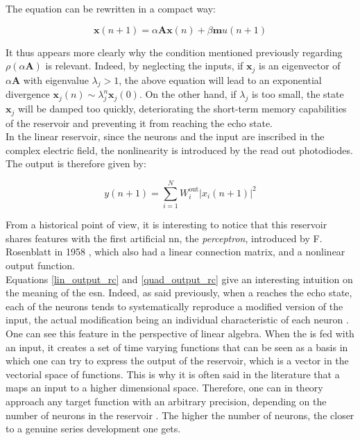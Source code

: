 The equation can be rewritten in a compact way:

\begin{equation}
	\mathbf{x}(n+1) = \alpha \mathbf{A} \mathbf{x}(n) + \beta \mathbf{m} u(n+1)
	\label{rc_lin_dynamics}
\end{equation}

It thus appears more clearly why the condition mentioned previously regarding $\rho \left( \alpha \mathbf{A} \right)$ is relevant. Indeed, by neglecting the inputs, if $\mathbf{x}_j$ is an eigenvector of $\alpha \mathbf{A}$ with eigenvalue $\lambda_j>1$, the above equation will lead to an exponential divergence $\mathbf{x}_j(n) \sim \lambda_j^n \mathbf{x}_j(0)$. On the other hand, if $\lambda_j$ is too small, the state $\mathbf{x}_j$ will be damped too quickly, deteriorating the short-term memory capabilities of the reservoir and preventing it from reaching the echo state. \\

In the linear reservoir, since the neurons and the input are inscribed in the complex electric field, the nonlinearity is introduced by the read out photodiodes. The output is therefore given by:

\begin{equation}
	y(n+1) = \sum_{i=1}^{N} W^{\text{out}}_i |x_i (n+1)|^2
	\label{quad_output_rc}
\end{equation}

From a historical point of view, it is interesting to notice that this reservoir shares features with the first artificial \gls{nn}, the \emph{perceptron}, introduced by F. Rosenblatt in 1958 \cite{Rosenblatt58theperceptron}, which also had a linear connection matrix, and a nonlinear output function.\\

 Equations \eqref{lin_output_rc} and \eqref{quad_output_rc} give an interesting intuition on the meaning of the \gls{esn}. Indeed, as said previously, when a \rc reaches the echo state, each of the neurons tends to systematically reproduce a modified version of the input, the actual modification being an individual characteristic of each neuron \cite{Jaeger2004}. One can see this feature in the perspective of linear algebra. When the \rcer is fed with an input, it creates a set of time varying functions that can be seen as a basis in which one can try to express the output of the reservoir, which is a vector in the vectorial space of functions. This is why it is often said in the literature that a \rcer maps an input to a higher dimensional space. Therefore, one can in theory approach any target function with an arbitrary precision, depending on the number of neurons in the reservoir \cite{Jaeger2004}. The higher the number of neurons, the closer to a genuine series development one gets.\\


